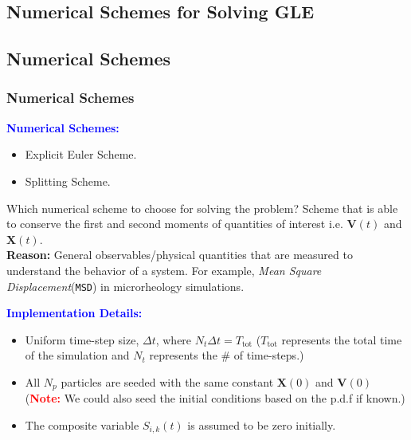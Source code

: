 \documentclass[a4paper,10pt]{beamer}
\newcommand{\BS}[1]{\boldsymbol{#1}}
\begin{document}
	\begin{frame}
		\section{Numerical Schemes for Solving GLE}
		\subsection{Numerical Schemes}
		\frametitle{Numerical Schemes}
		\footnotesize
		\textcolor{blue}{\textbf{Numerical Schemes:}}
		\begin{itemize}
			\item {Explicit Euler Scheme.}
			\item {Splitting Scheme.}
		\end{itemize}
		\begin{alertblock}{Which numerical scheme to choose for solving the problem?}
			{Scheme that is able to conserve the first and second moments of quantities of interest i.e. $\BS{V}(t)$ and $\BS{X}(t)$.} \\
			\vspace{0.2cm}
			\textbf{Reason: } General observables/physical quantities that are measured to understand the behavior of a system. For example, \textit{Mean Square Displacement}(\texttt{MSD}) in microrheology simulations.
		\end{alertblock}
		\textcolor{blue}{\textbf{Implementation Details:}}
		\begin{itemize}
			\item {Uniform time-step size, $\Delta t$, where $N_{t} \Delta t = T_{\text{tot}}$ ($T_{\text{tot}}$ represents the total time of the simulation and $N_{t}$ represents the \# of time-steps.)}
			\item {All $N_{p}$ particles are seeded with the same constant $\BS{X}(0)$ and $\BS{V}(0)$ (\textcolor{red}{\textbf{Note:}} We could also seed the initial conditions based on the p.d.f if known.)}
			\item {The composite variable $S_{i,k}(t)$ is assumed to be zero initially.}
		\end{itemize}
	\end{frame}
	
\end{document}
